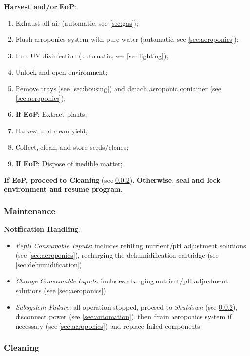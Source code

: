 \clearpage

\textbf{Harvest and/or EoP}:
\begin{enumerate}
    \item Exhaust all air (automatic, see \ref{sec:gas});
    \item Flush aeroponics system with pure water (automatic, see \ref{sec:aeroponics});
    \item Run UV disinfection (automatic, see \ref{sec:lighting});
    \item Unlock and open environment;
    \item Remove trays (see \ref{sec:housing}) and detach aeroponic container (see \ref{sec:aeroponics});
    \item \textbf{If EoP}: Extract plants;
    \item Harvest and clean yield;
    \item Collect, clean, and store seeds/clones;
    \item \textbf{If EoP}: Dispose of inedible matter;
\end{enumerate}

\textbf{If EoP, proceed to Cleaning} (see \ref{sec:process_cleaning})\textbf{. Otherwise, seal and lock environment and resume program.}

\subsubsection{Maintenance}
\label{sec:process_maintenance}

\textbf{Notification Handling}:
\begin{itemize}
    \item \textit{Refill Consumable Inputs}: includes refilling nutrient/pH adjustment solutions (see \ref{sec:aeroponics}), recharging the dehumidification cartridge (see \ref{sec:dehumidification})
    \item \textit{Change Consumable Inputs}: includes changing nutrient/pH adjustment solutions (see \ref{sec:aeroponics})
    \item \textit{Subsystem Failure}: all operation stopped, proceed to \textit{Shutdown} (see \ref{sec:process_cleaning}), disconnect power (see \ref{sec:automation}), then drain aeroponics system if necessary (see \ref{sec:aeroponics}) and replace failed components
\end{itemize}

\subsubsection{Cleaning}
\label{sec:process_cleaning}

